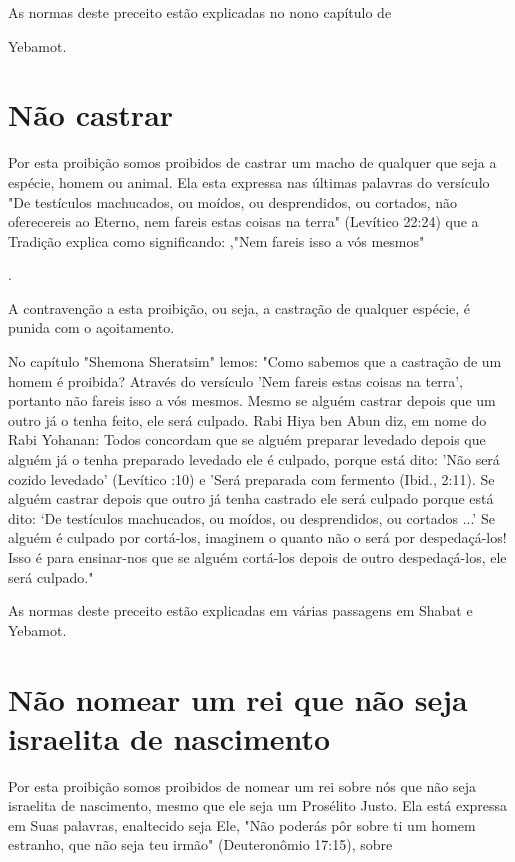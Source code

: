 \begin{itemize}
\begin{enumrate}
\begin{itemize}
\begin{itemize}
\begin{itemize}
As normas deste preceito estão explicadas no nono capítulo de


Yebamot.

\section{Não castrar}

Por esta proibição somos proibidos de castrar um macho de qual­quer que
seja a espécie, homem ou animal. Ela esta expressa nas últimas pala­vras
do versículo "De testículos machucados, ou moídos, ou desprendidos, ou
cortados, não oferecereis ao Eterno, nem fareis estas coisas na terra"
(Levítico 22:24) que a Tradição explica como significando: ,"Nem fareis
isso a vós mesmos"

.

A contravenção a esta proibição, ou seja, a castração de qualquer
es­pécie, é punida com o açoitamento.

No capítulo "Shemona Sheratsim" lemos: "Como sabemos que a cas­tração de
um homem é proibida? Através do versículo 'Nem fareis estas coisas na
terra', portanto não fareis isso a vós mesmos. Mesmo se alguém castrar
de­pois que um outro já o tenha feito, ele será culpado. Rabi Hiya ben
Abun diz, em nome do Rabi Yohanan: Todos concordam que se alguém
preparar leveda­do depois que alguém já o tenha preparado levedado ele é
culpado, porque está dito: 'Não será cozido levedado' (Levítico :10) e
'Será preparada com fer­mento (Ibid., 2:11). Se alguém castrar depois
que outro já tenha castrado ele será culpado porque está dito: `De
testículos machucados, ou moídos, ou des­prendidos, ou cortados ...' Se
alguém é culpado por cortá-los, imaginem o quanto não o será por
despedaçá-los! Isso é para ensinar-nos que se alguém cortá-los depois de
outro despedaçá-los, ele será culpado."

As normas deste preceito estão explicadas em várias passagens em Shabat
e Yebamot.

\section{Não nomear um rei que não seja israelita de nascimento}

Por esta proibição somos proibidos de nomear um rei sobre nós que não
seja israelita de nascimento, mesmo que ele seja um Prosélito Justo. Ela
es­tá expressa em Suas palavras, enaltecido seja Ele, "Não poderás pôr
sobre ti um homem estranho, que não seja teu irmão" (Deuteronômio
17:15), sobre


\end{itemize}
\end{itemize}
\end{itemize}
\end{enumrate}
\end{itemize}
